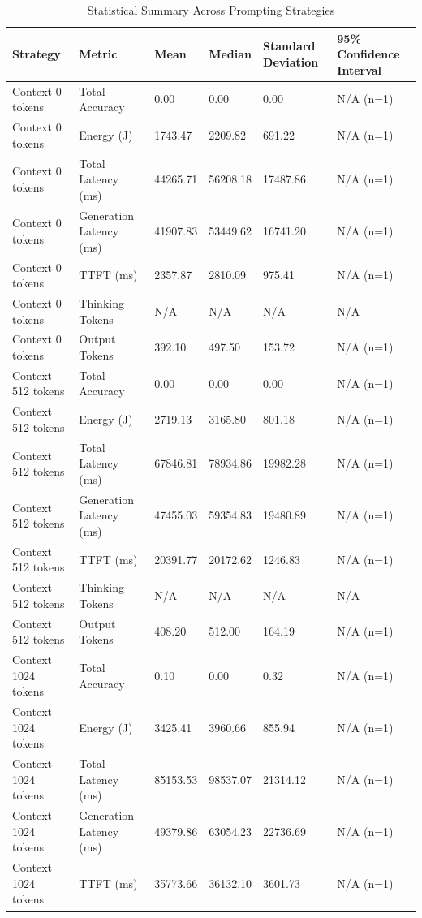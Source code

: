 \begin{table}
\caption{Statistical Summary Across Prompting Strategies}
\label{tab:statistical_summary}
\begin{tabular}{llllll}
\toprule
Strategy & Metric & Mean & Median & Standard Deviation & 95\% Confidence Interval \\
\midrule
Context 0 tokens & Total Accuracy & 0.00 & 0.00 & 0.00 & N/A (n=1) \\
Context 0 tokens & Energy (J) & 1743.47 & 2209.82 & 691.22 & N/A (n=1) \\
Context 0 tokens & Total Latency (ms) & 44265.71 & 56208.18 & 17487.86 & N/A (n=1) \\
Context 0 tokens & Generation Latency (ms) & 41907.83 & 53449.62 & 16741.20 & N/A (n=1) \\
Context 0 tokens & TTFT (ms) & 2357.87 & 2810.09 & 975.41 & N/A (n=1) \\
Context 0 tokens & Thinking Tokens & N/A & N/A & N/A & N/A \\
Context 0 tokens & Output Tokens & 392.10 & 497.50 & 153.72 & N/A (n=1) \\
Context 512 tokens & Total Accuracy & 0.00 & 0.00 & 0.00 & N/A (n=1) \\
Context 512 tokens & Energy (J) & 2719.13 & 3165.80 & 801.18 & N/A (n=1) \\
Context 512 tokens & Total Latency (ms) & 67846.81 & 78934.86 & 19982.28 & N/A (n=1) \\
Context 512 tokens & Generation Latency (ms) & 47455.03 & 59354.83 & 19480.89 & N/A (n=1) \\
Context 512 tokens & TTFT (ms) & 20391.77 & 20172.62 & 1246.83 & N/A (n=1) \\
Context 512 tokens & Thinking Tokens & N/A & N/A & N/A & N/A \\
Context 512 tokens & Output Tokens & 408.20 & 512.00 & 164.19 & N/A (n=1) \\
Context 1024 tokens & Total Accuracy & 0.10 & 0.00 & 0.32 & N/A (n=1) \\
Context 1024 tokens & Energy (J) & 3425.41 & 3960.66 & 855.94 & N/A (n=1) \\
Context 1024 tokens & Total Latency (ms) & 85153.53 & 98537.07 & 21314.12 & N/A (n=1) \\
Context 1024 tokens & Generation Latency (ms) & 49379.86 & 63054.23 & 22736.69 & N/A (n=1) \\
Context 1024 tokens & TTFT (ms) & 35773.66 & 36132.10 & 3601.73 & N/A (n=1) \\

\end{tabular}
\end{table}
